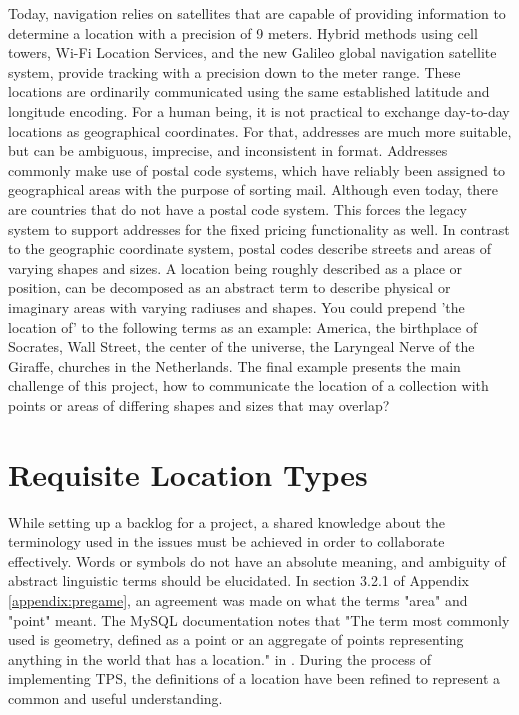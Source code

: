 Today, navigation relies on satellites that are capable of providing information to determine a location with a precision of 9 meters. Hybrid methods using cell towers, Wi-Fi Location Services, and the new Galileo global navigation satellite system, provide tracking with a precision down to the meter range. These locations are ordinarily communicated using the same established latitude and longitude encoding. For a human being, it is not practical to exchange day-to-day locations as geographical coordinates. For that, addresses are much more suitable, but can be ambiguous, imprecise, and inconsistent in format. Addresses commonly make use of postal code systems, which have reliably been assigned to geographical areas with the purpose of sorting mail. Although even today, there are countries that do not have a postal code system. This forces the legacy system to support addresses for the fixed pricing functionality as well. In contrast to the geographic coordinate system, postal codes describe streets and areas of varying shapes and sizes. A location being roughly described as a place or position, can be decomposed as an abstract term to describe physical or imaginary areas with varying radiuses and shapes. You could prepend 'the location of' to the following terms as an example: America, the birthplace of Socrates, Wall Street, the center of the universe, the Laryngeal Nerve of the Giraffe, churches in the Netherlands. The final example presents the main challenge of this project, how to communicate the location of a collection with points or areas of differing shapes and sizes that may overlap?

%
\section{Requisite Location Types}
While setting up a backlog for a project, a shared knowledge about the terminology used in the issues must be achieved in order to collaborate effectively. Words or symbols do not have an absolute meaning, and ambiguity of abstract linguistic terms should be elucidated. In section 3.2.1 of Appendix \ref{appendix:pregame}, an agreement was made on what the terms "area" and "point" meant. The MySQL documentation notes that "The term most commonly used is geometry, defined as a point or an aggregate of points representing anything in the world that has a location." in \cite{MySQL-Spat}. During the process of implementing TPS, the definitions of a location have been refined to represent a common and useful understanding.

